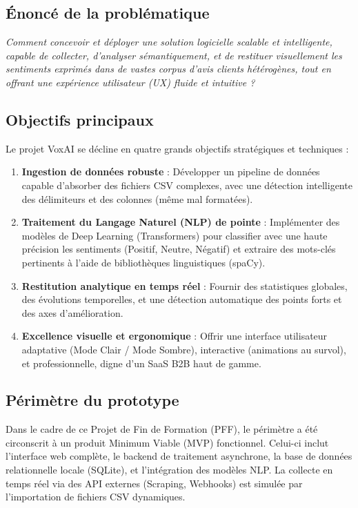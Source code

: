 \documentclass[12pt,a4paper]{article}
\begin{document}
\subsection{Énoncé de la problématique}
\textit{Comment concevoir et déployer une solution logicielle scalable et intelligente, capable de collecter, d'analyser sémantiquement, et de restituer visuellement les sentiments exprimés dans de vastes corpus d'avis clients hétérogènes, tout en offrant une expérience utilisateur (UX) fluide et intuitive ?}

\subsection{Objectifs principaux}
Le projet VoxAI se décline en quatre grands objectifs stratégiques et techniques :
\begin{enumerate}
    \item \textbf{Ingestion de données robuste} : Développer un pipeline de données capable d'absorber des fichiers CSV complexes, avec une détection intelligente des délimiteurs et des colonnes (même mal formatées).
    \item \textbf{Traitement du Langage Naturel (NLP) de pointe} : Implémenter des modèles de Deep Learning (Transformers) pour classifier avec une haute précision les sentiments (Positif, Neutre, Négatif) et extraire des mots-clés pertinents à l'aide de bibliothèques linguistiques (spaCy).
    \item \textbf{Restitution analytique en temps réel} : Fournir des statistiques globales, des évolutions temporelles, et une détection automatique des points forts et des axes d'amélioration.
    \item \textbf{Excellence visuelle et ergonomique} : Offrir une interface utilisateur adaptative (Mode Clair / Mode Sombre), interactive (animations au survol), et professionnelle, digne d'un SaaS B2B haut de gamme.
\end{enumerate}

\subsection{Périmètre du prototype}
Dans le cadre de ce Projet de Fin de Formation (PFF), le périmètre a été circonscrit à un produit Minimum Viable (MVP) fonctionnel. Celui-ci inclut l'interface web complète, le backend de traitement asynchrone, la base de données relationnelle locale (SQLite), et l'intégration des modèles NLP. La collecte en temps réel via des API externes (Scraping, Webhooks) est simulée par l'importation de fichiers CSV dynamiques.
\newpage
\end{document}
